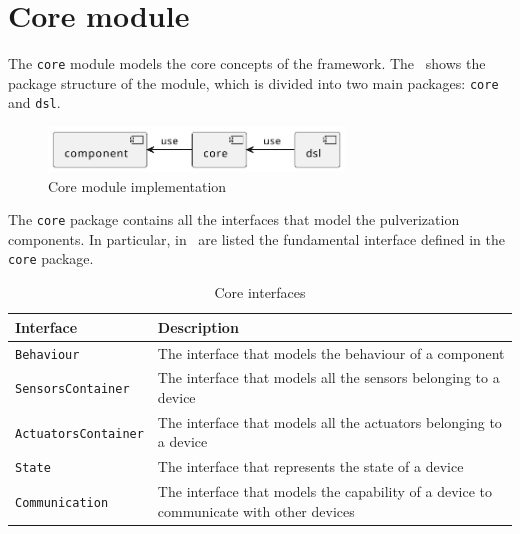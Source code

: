 
\section{Core module}
\label{sec:core-module-impl}

The \texttt{core} module models the core concepts of the framework. The~ shows the package structure of the module, which
is divided into two main packages: \texttt{core} and \texttt{dsl}.

\begin{figure}[h]
	\centering
	\includegraphics[width=0.7\textwidth]{figures/core-package-diagram.pdf}
	\caption{Core module implementation}
	\label{fig:core-module-impl}
\end{figure}

The \texttt{core} package contains all the interfaces that model the pulverization components.
In particular, in~ are listed the fundamental interface defined in the \texttt{core} package.

\begin{table}[ht]
	\begin{tabularx}{\textwidth}{l X}
		\toprule
		Interface                   & Description                                                                            \\ \midrule
		\texttt{Behaviour}          & The interface that models the behaviour of a component                                 \\
		\texttt{SensorsContainer}   & The interface that models all the sensors belonging to a device                        \\
		\texttt{ActuatorsContainer} & The interface that models all the actuators belonging to a device                      \\
		\texttt{State}              & The interface that represents the state of a device                                    \\
		\texttt{Communication}      & The interface that models the capability of a device to communicate with other devices \\ \bottomrule
	\end{tabularx}
	\caption{Core interfaces}
	\label{tab:core-interfaces}
\end{table}

